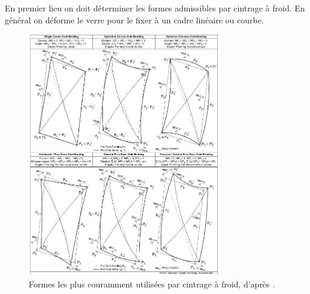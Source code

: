 \documentclass[11pt,titlepage]{article}
\begin{document}
En premier lieu on doit déterminer les formes admissibles par cintrage à froid. En général on déforme le verre pour le fixer à un cadre linéaire ou courbe.
\begin{figure}[H]
    \centering
    \includegraphics[width=0.75\textwidth]{img/cintrage_froid/fig4_74.jpg}
    \caption{Formes les plus couramment utilisées par cintrage à froid, d'après \Textcite{meinhardt}.}
    \label{fig:cintragefroidtypes}
\end{figure}
\end{document}
